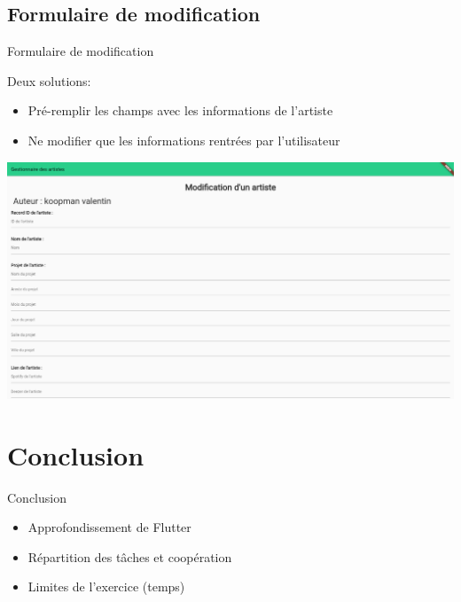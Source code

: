 \documentclass{beamer}
\begin{document}
\subsection{Formulaire de modification}

\begin{frame}{Formulaire de modification}

Deux solutions:

\begin{itemize}
    \item Pré-remplir les champs avec les informations de l'artiste
    \item Ne modifier que les informations rentrées par l'utilisateur
\end{itemize}

\begin{center}
    \includegraphics[height=.5849\textheight]{formulaire.jpg}
\end{center}

\end{frame}

\section{Conclusion}

\begin{frame}{Conclusion}

\begin{itemize}
    \item Approfondissement de Flutter
    \item Répartition des tâches et coopération
    \item Limites de l'exercice (temps)
\end{itemize}

\end{frame}
\end{document}
